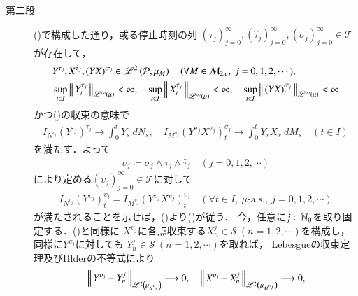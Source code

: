 \begin{prf}
\begin{description}
			\item[第二段]
				()で構成した通り，或る停止時刻の列
				$(\tau_j)_{j=0}^{\infty},(\hat{\tau}_j)_{j=0}^{\infty},(\sigma_j)_{j=0}^{\infty} \in \mathcal{T}$が存在して，
				\begin{align}
					&Y^{\tau_j},X^{\hat{\tau}_j},(YX)^{\sigma_j} \in \semiLp{2}{\mathcal{P},\mu_{M}}
					\quad (\forall M \in \mathcal{M}_{2,c},\ j=0,1,2,\cdots), \\
					&\sup{t \in I}{\Norm{Y^{\tau_j}_t}{\semiLp{\infty}{\mu}}} < \infty,
					\quad \sup{t \in I}{\Norm{X^{\hat{\tau}_j}_t}{\semiLp{\infty}{\mu}}} < \infty,
					\quad \sup{t \in I}{\Norm{(YX)^{\sigma_j}_t}{\semiLp{\infty}{\mu}}} < \infty
					\label{eq:Ito-Integral_on_M_c_loc_report_7_6}
				\end{align}
				かつ()の収束の意味で
				\begin{align}
					I_{N^{\tau_j}}(Y^{\tau_j})^{\tau_j} \longrightarrow \int_0^t Y_s\ dN_s,
					\quad 
					I_{M^{\sigma_j}}(Y^{\sigma_j}X^{\sigma_j})^{\sigma_j}_t \longrightarrow \int_0^t Y_s X_s\ dM_s
					\quad (t \in I)
					\label{eq:Ito-Integral_on_M_c_loc_report_7_1}
				\end{align}
				を満たす．よって
				\begin{align}
					\upsilon_j \coloneqq \sigma_j \wedge \tau_j \wedge \hat{\tau}_j
					\quad (j=0,1,2,\cdots)
				\end{align}
				により定める$(\upsilon_j)_{j=0}^{\infty} \in \mathcal{T}$に対して
				\begin{align}
					I_{N^{\upsilon_j}} (Y^{\upsilon_j})^{\upsilon_j}_t
					= I_{M^{\upsilon_j}} (Y^{\upsilon_j}X^{\upsilon_j})^{\upsilon_j}_t
					\quad (\forall t \in I,\ \mbox{$\mu$-a.s.},\ j=0,1,2,\cdots)
					\label{eq:Ito-Integral_on_M_c_loc_report_7_2}
				\end{align}
				が満たされることを示せば，()より()が従う．
				今，任意に$j \in \mathbb{N}_0$を取り固定する．()と同様に
				$X^{\upsilon_j}$に各点収束する$X^j_n \in \mathcal{S}\ (n=1,2,\cdots)$を構成し，同様に$Y^{\upsilon_j}$に対しても
				$Y^j_n \in \mathcal{S}\ (n=1,2,\cdots)$を取れば，
				Lebesgueの収束定理及びHlderの不等式により
				\begin{align}
					&\Norm{Y^{\upsilon_j} - Y^j_n}{\semiLp{2}{\mu_{N^{\upsilon_j}}}} \longrightarrow 0, 
					\quad \Norm{X^{\upsilon_j} - X^j_n}{\semiLp{2}{\mu_{M^{\upsilon_j}}}} \longrightarrow 0, \label{eq:Ito-Integral_on_M_c_loc_report_7_5} \\

\end{align}
\end{description}
\end{prf}
